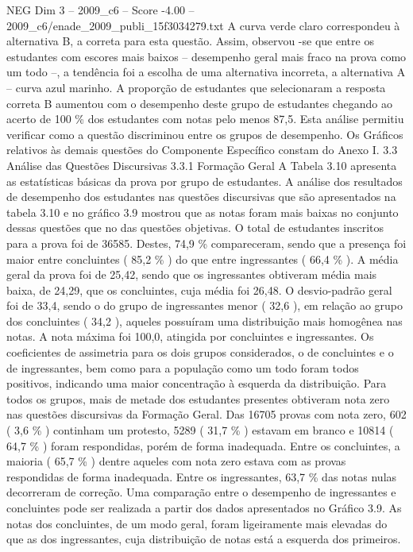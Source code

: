 \begin{textsample}{NEG Dim 3 – 2009\_c6 – Score -4.00 – 2009\_c6/enade\_2009\_publi\_15f3034279.txt}
A curva verde claro correspondeu à alternativa B, a correta para esta questão.
Assim, observou -se que entre os estudantes com escores mais baixos – desempenho geral mais fraco na prova como um todo –, a tendência foi a escolha de uma alternativa incorreta, a alternativa A – curva azul marinho.
A proporção de estudantes que selecionaram a resposta correta B aumentou com o desempenho deste grupo de estudantes chegando ao acerto de 100 \% dos estudantes com notas pelo menos 87,5.
Esta análise permitiu verificar como a questão discriminou entre os grupos de desempenho.
Os Gráficos relativos às demais questões do Componente Específico constam do Anexo I. 3.3 Análise das Questões Discursivas 3.3.1 Formação Geral A Tabela 3.10 apresenta as estatísticas básicas da prova por grupo de estudantes.
A análise dos resultados de desempenho dos estudantes nas questões discursivas que são apresentados na tabela 3.10 e no gráfico 3.9 mostrou que as notas foram mais baixas no conjunto dessas questões que no das questões objetivas.
O total de estudantes inscritos para a prova foi de 36585.
Destes, 74,9 \% compareceram, sendo que a presença foi maior entre concluintes ( 85,2 \% ) do que entre ingressantes ( 66,4 \% ).
A média geral da prova foi de 25,42, sendo que os ingressantes obtiveram média mais baixa, de 24,29, que os concluintes, cuja média foi 26,48.
O desvio-padrão geral foi de 33,4, sendo o do grupo de ingressantes menor ( 32,6 ), em relação ao grupo dos concluintes ( 34,2 ), aqueles possuíram uma distribuição mais homogênea nas notas.
A nota máxima foi 100,0, atingida por concluintes e ingressantes.
Os coeficientes de assimetria para os dois grupos considerados, o de concluintes e o de ingressantes, bem como para a população como um todo foram todos positivos, indicando uma maior concentração à esquerda da distribuição.
Para todos os grupos, mais de metade dos estudantes presentes obtiveram nota zero nas questões discursivas da Formação Geral.
Das 16705 provas com nota zero, 602 ( 3,6 \% ) continham um protesto, 5289 ( 31,7 \% ) estavam em branco e 10814 ( 64,7 \% ) foram respondidas, porém de forma inadequada.
Entre os concluintes, a maioria ( 65,7 \% ) dentre aqueles com nota zero estava com as provas respondidas de forma inadequada.
Entre os ingressantes, 63,7 \% das notas nulas decorreram de correção.
Uma comparação entre o desempenho de ingressantes e concluintes pode ser realizada a partir dos dados apresentados no Gráfico 3.9.
As notas dos concluintes, de um modo geral, foram ligeiramente mais elevadas do que as dos ingressantes, cuja distribuição de notas está a esquerda dos primeiros.

\end{textsample}
